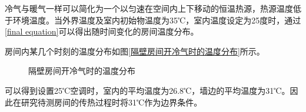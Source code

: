 冷气与暖气一样可以简化为一个以匀速在空间内上下移动的恒温热源，热源温度低于环境温度。当外界温度及室内初始物温度为35℃，室内温度设定为25度时，通过\eqref{final equation}可以得出随时间变化的房间温度分布。

房间内某几个时刻的温度分布如图\eqref{隔壁房间开冷气时的温度分布}所示。
\\
\begin{figure}[h]
    \centering
    \qquad
    \qquad
    \qquad
    \qquad
    
    \caption{隔壁房间开冷气时的温度分布}
    \label{隔壁房间开冷气时的温度分布}
\end{figure}

可以得到设置25℃空调时，室内的平均温度为26.8℃，墙边的平均温度为31℃。因此在研究待测房间的传热过程时将31℃作为边界条件。
